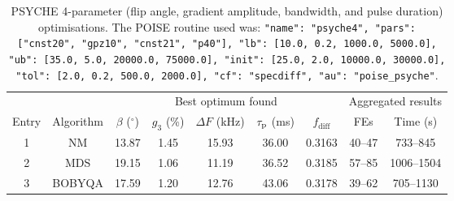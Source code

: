 \begin{table}
    \centering
    \begin{tabular}{ccccccccc}
        \toprule
              &           & \multicolumn{5}{c}{Best optimum found} & \multicolumn{2}{c}{Aggregated results} \\
                            \cmidrule(lr){3-7}                       \cmidrule(lr){8-9}
        Entry & Algorithm & $\beta$ ($^\circ$) & $g_3$ (\%) & $\Delta F$ (\unit{\kHz}) & $\tau_\mathrm{p}$ (\unit{\ms}) & $f_\text{diff}$ & FEs    & Time (\unit{\s}) \\
        \midrule
        1     & NM        & 13.87              & 1.45       & 15.93                  & 36.00              & 0.3163          & 40--47 & 733--845       \\
        2     & MDS       & 19.15              & 1.06       & 11.19                  & 36.52              & 0.3185          & 57--85 & 1006--1504     \\
        3     & BOBYQA    & 17.59              & 1.20       & 12.76                  & 43.06              & 0.3178          & 39--62 & 705--1130      \\
        \bottomrule
    \end{tabular}
    \caption[PSYCHE 4-parameter optimisations]{
        PSYCHE 4-parameter (flip angle, gradient amplitude, bandwidth, and pulse duration) optimisations.
        The POISE routine used was: \texttt{{"name": "psyche4", "pars": ["cnst20", "gpz10", "cnst21", "p40"], "lb": [10.0, 0.2, 1000.0, 5000.0], "ub": [35.0, 5.0, 20000.0, 75000.0], "init": [25.0, 2.0, 10000.0, 30000.0], "tol": [2.0, 0.2, 500.0, 2000.0], "cf": "specdiff", "au": "poise_psyche"}}.
    }
    \label{tbl:poise_psyche4p}
\end{table}
